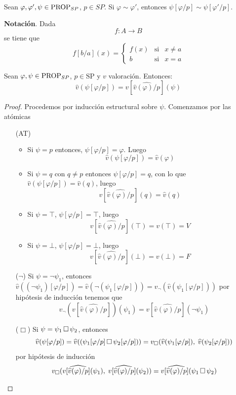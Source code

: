 \begin{theorem}
Sean $\varphi, \varphi', \psi \in \mbox{PROP}_{SP}$, $p \in SP$. Si $\varphi \sim \varphi'$, entonces $\psi[\varphi/p] \sim \psi[\varphi'/p]$.
\end{theorem}

\textbf{Notación}. Dada
\[f:  A  \rightarrow  B\]
se tiene que
\[f[b/a](x)= \left \lbrace \begin{matrix}
f(x) & \mbox{si} & x \neq a\\
b & \mbox{si} & x = a
\end{matrix}\right. \]

\begin{lemma}
Sean $\varphi, \psi \in \mbox{PROP}_{SP}$, $p \in \mbox{SP}$ y $v$ valoración. Entonces:
\[ \widehat{v}(\psi[\varphi/p]) =  v[\widehat{\widehat{v}(\varphi)/p}](\psi)\]
\end{lemma}
\begin{proof}
Procedemos por inducción estructural sobre $\psi$. Comenzamos por las atómicas
\begin{itemize}
\item[(AT)]
\begin{itemize}
	\item Si $\psi = p$ entonces, $\psi[\varphi/p] = \varphi$. Luego 
    	 \[ \widehat{v}(\psi[\varphi/p]) = \widehat{v}(\varphi) \]
   	\item Si $\psi = q$ con $q \neq p$ entonces $\psi[\varphi/p] = q$, con lo que $\widehat{v}(\psi[\varphi/p]) = \widehat{v}(q)$, luego 
   	\[ v[\widehat{\widehat{v}(\varphi)/p}](q) = \widehat{v}(q) \]
   	\item Si $\psi = \top$, $\psi[\varphi/p] = \top$, luego 
   	\[ v[\widehat{\widehat{v}(\varphi)/p}](\top) = v(\top) = V \]
   	\item Si $\psi = \bot$, $\psi[\varphi/p] = \bot$, luego 
   	\[ v[\widehat{\widehat{v}(\varphi)/p}](\bot) = v(\bot) = F \]
\end{itemize} 
\item[($\neg$)] Si $\psi = \neg \psi_1$, entonces $\widehat{v}((\neg\psi_1)[\varphi/p]) = \widehat{v}(\neg(\psi_1[\varphi/p])) = v_{\neg}(\widehat{v}(\psi_1[\varphi/p]))$ por hipótesis de inducción tenemos que
\[  v_{\neg}(v[\widehat{\widehat{v}(\varphi)/p}])(\psi_1) = v[\widehat{\widehat{v}(\varphi)/p}](\neg\psi_1) \]   
\item[($\Box$)] Si $\psi = \psi_1 \, \Box \, \psi_2$, entonces 
\[ \widehat{v}(\psi[\varphi/p]) = \widehat{v}((\psi_1[\varphi/p]  \, \Box \,  \psi_2[\varphi/p])) = v_{\Box}(\widehat{v}(\psi_1[\varphi/p]), \; \widehat{v}(\psi_2[\varphi/p])) \]
 por hipótesis de inducción  
 \[ v_{\Box}(v[\widehat{\widehat{v}(\varphi)/p}](\psi_1), \; v[\widehat{\widehat{v}(\varphi)/p}](\psi_2)) = v[\widehat{\widehat{v}(\varphi)/p}](\psi_1 \, \Box \, \psi_2) \]
\end{itemize}
\end{proof}

